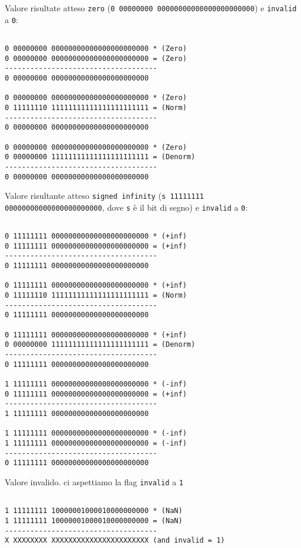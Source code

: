 \documentclass[twoside,11pt]{article}
\begin{document}
{Valore risultate atteso \verb|zero| (\verb|0 00000000 00000000000000000000000|) e \verb|invalid| a \verb|0|:

\begin{verbatim}

0 00000000 00000000000000000000000 * (Zero)
0 00000000 00000000000000000000000 = (Zero)
------------------------------------
0 00000000 00000000000000000000000

0 00000000 00000000000000000000000 * (Zero)
0 11111110 11111111111111111111111 = (Norm)
------------------------------------
0 00000000 00000000000000000000000

0 00000000 00000000000000000000000 * (Zero)
0 00000000 11111111111111111111111 = (Denorm)
------------------------------------
0 00000000 00000000000000000000000

\end{verbatim}

Valore risultante atteso \verb|signed infinity| (\verb|s 11111111 00000000000000000000000|, dove \verb|s| è il bit di segno) e \verb|invalid| a \verb|0|:

\begin{verbatim}

0 11111111 00000000000000000000000 * (+inf)
0 11111111 00000000000000000000000 = (+inf)
------------------------------------
0 11111111 00000000000000000000000

0 11111111 00000000000000000000000 * (+inf)
0 11111110 11111111111111111111111 = (Norm)
------------------------------------
0 11111111 00000000000000000000000

0 11111111 00000000000000000000000 * (+inf)
0 00000000 11111111111111111111111 = (Denorm)
------------------------------------
0 11111111 00000000000000000000000

1 11111111 00000000000000000000000 * (-inf)
0 11111111 00000000000000000000000 = (+inf)
------------------------------------
1 11111111 00000000000000000000000

1 11111111 00000000000000000000000 * (-inf)
1 11111111 00000000000000000000000 = (-inf)
------------------------------------
0 11111111 00000000000000000000000

\end{verbatim}


Valore invalido. ci aspettiamo la flag \verb|invalid| a \verb|1|


\begin{verbatim}

1 11111111 10000001000010000000000 * (NaN)
1 11111111 10000001000010000000000 = (NaN)
------------------------------------
X XXXXXXXX XXXXXXXXXXXXXXXXXXXXXXX (and invalid = 1)


\end{verbatim}}
\end{document}
